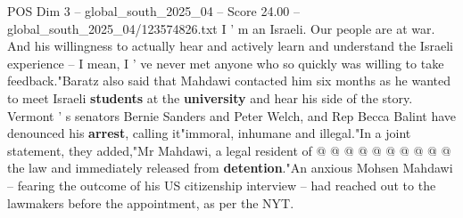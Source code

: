 \begin{textsample}{POS Dim 3 – global\_south\_2025\_04 – Score 24.00 – global\_south\_2025\_04/123574826.txt}
I ' m an Israeli.
Our people are at war.
And his willingness to actually hear and actively learn and understand the Israeli experience -- I mean, I ' ve never met anyone who so quickly was willing to take feedback."Baratz also said that Mahdawi contacted him six months as he wanted to meet Israeli \textbf{students} at the \textbf{university} and hear his side of the story.
Vermont ' s senators Bernie Sanders and Peter Welch, and Rep Becca Balint have denounced his \textbf{arrest}, calling it"immoral, inhumane and illegal."In a joint statement, they added,"Mr Mahdawi, a legal resident of @ @ @ @ @ @ @ @ @ @ the law and immediately released from \textbf{detention}."An anxious Mohsen Mahdawi -- fearing the outcome of his US citizenship interview -- had reached out to the lawmakers before the appointment, as per the NYT.

\end{textsample}
